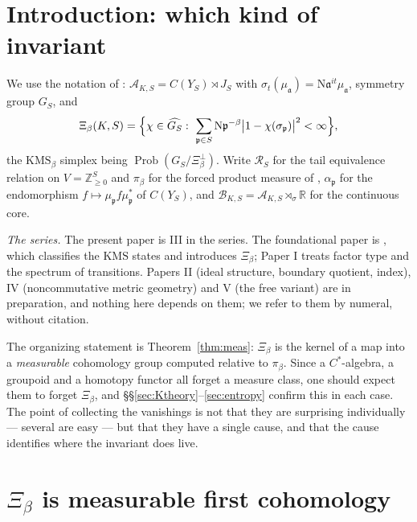 \documentclass[11pt]{amsart}
\numberwithin{equation}{section}
\theoremstyle{definition}
\theoremstyle{remark}
\newcommand{\Z}{\mathbb{Z}}
\newcommand{\R}{\mathbb{R}}
\newcommand{\cA}{\mathcal{A}}
\newcommand{\cB}{\mathcal{B}}
\newcommand{\cR}{\mathcal{R}}
\newcommand{\pp}{\mathfrak{p}}
\newcommand{\aaa}{\mathfrak{a}}
\newcommand{\Ns}{\mathrm{N}}
\newcommand{\Prob}{\operatorname{Prob}}
\begin{document}
\maketitle

\tableofcontents

\section{Introduction: which kind of invariant}

We use the notation of \cite{Main}: $\cA_{K,S}=C(Y_S)\rtimes J_S$ with
$\sigma_t(\mu_\aaa)=\Ns\aaa^{it}\mu_\aaa$, symmetry group $G_S$, and
\begin{equation}\label{eq:Xi}
\Xi_\beta(K,S)=\Bigl\{\chi\in\widehat{G_S}:\ \sum_{\pp\in S}\Ns\pp^{-\beta}\bigl|1-\chi(\sigma_\pp)\bigr|^2<\infty\Bigr\},
\end{equation}
the $\mathrm{KMS}_\beta$ simplex being $\Prob(G_S/\Xi_\beta^\perp)$. Write
$\cR_S$ for the tail equivalence relation on $V=\Z_{\ge0}^S$ and $\pi_\beta$ for the forced
product measure of \cite[Lem.~2.10]{Main}, $\alpha_\pp$ for the endomorphism
$f\mapsto\mu_\pp f\mu_\pp^*$ of $C(Y_S)$, and $\cB_{K,S}=\cA_{K,S}\rtimes_\sigma\R$ for the
continuous core.

\emph{The series.} The present paper is III in the series. The foundational paper is
\cite{Main}, which classifies the $\mathrm{KMS}$ states and introduces $\Xi_\beta$; Paper I
\cite{SeriesI} treats factor type and the spectrum of transitions. Papers II (ideal
structure, boundary quotient, index), IV (noncommutative metric geometry) and V (the free
variant) are in preparation, and nothing here depends on them; we refer to them by numeral,
without citation.

The organizing statement is Theorem~\ref{thm:meas}: $\Xi_\beta$ is the kernel of a map into
a \emph{measurable} cohomology group computed relative to $\pi_\beta$. Since a
$C^*$-algebra, a groupoid and a homotopy functor all forget a measure class, one should
expect them to forget $\Xi_\beta$, and \S\S\ref{sec:Ktheory}--\ref{sec:entropy} confirm this
in each case. The point of collecting the vanishings is not that they are surprising
individually --- several are easy --- but that they have a single cause, and that the cause
identifies where the invariant does live.

\section{$\Xi_\beta$ is measurable first cohomology}\label{sec:meas}
\end{document}
